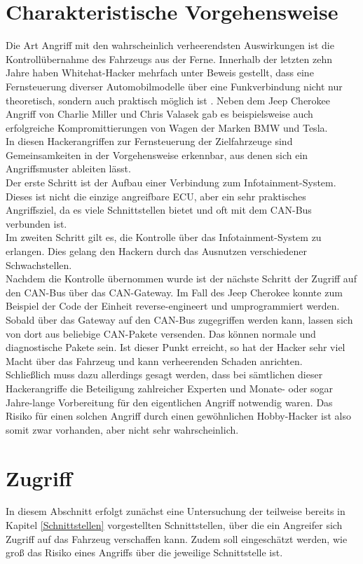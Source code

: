 \section{Charakteristische Vorgehensweise}\label{Vorgehen}
Die Art Angriff mit den wahrscheinlich verheerendsten Auswirkungen ist die Kontrollübernahme des Fahrzeugs aus der Ferne. Innerhalb der letzten zehn Jahre haben Whitehat-Hacker mehrfach unter Beweis gestellt, dass eine Fernsteuerung diverser Automobilmodelle über eine Funkverbindung nicht nur theoretisch, sondern auch praktisch möglich ist \cite[35]{Wurm.2022}. Neben dem Jeep Cherokee Angriff von Charlie Miller und Chris Valasek gab es beispielsweise auch erfolgreiche Kompromittierungen von Wagen der Marken BMW und Tesla.\\
In diesen Hackerangriffen zur Fernsteuerung der Zielfahrzeuge sind Gemeinsamkeiten in der Vorgehensweise erkennbar, aus denen sich ein Angriffsmuster ableiten lässt.\\
Der erste Schritt ist der Aufbau einer Verbindung zum Infotainment-System. Dieses ist nicht die einzige angreifbare \acs{ECU}, aber ein sehr praktisches Angriffsziel, da es viele Schnittstellen bietet und oft mit dem \acs{CAN}-Bus verbunden ist.\\
Im zweiten Schritt gilt es, die Kontrolle über das Infotainment-System zu erlangen. Dies gelang den Hackern durch das Ausnutzen verschiedener Schwachstellen.\\
Nachdem die Kontrolle übernommen wurde ist der nächste Schritt der Zugriff auf den \acs{CAN}-Bus über das \acs{CAN}-Gateway. Im Fall des Jeep Cherokee konnte zum Beispiel der Code der Einheit reverse-engineert und umprogrammiert werden.\\
Sobald über das Gateway auf den \acs{CAN}-Bus zugegriffen werden kann, lassen sich von dort aus beliebige \acs{CAN}-Pakete versenden. Das können normale und diagnostische Pakete sein. Ist dieser Punkt erreicht, so hat der Hacker sehr viel Macht über das Fahrzeug und kann verheerenden Schaden anrichten.\\
Schließlich muss dazu allerdings gesagt werden, dass bei sämtlichen dieser Hackerangriffe die Beteiligung zahlreicher Experten und Monate- oder sogar Jahre-lange Vorbereitung für den eigentlichen Angriff notwendig waren. Das Risiko für einen solchen Angriff durch einen gewöhnlichen Hobby-Hacker ist also somit zwar vorhanden, aber nicht sehr wahrscheinlich.


\section{Zugriff}
In diesem Abschnitt erfolgt zunächst eine Untersuchung der teilweise bereits in Kapitel \ref{Schnittstellen} vorgestellten Schnittstellen, über die ein Angreifer sich Zugriff auf das Fahrzeug verschaffen kann. Zudem soll eingeschätzt werden, wie groß das Risiko eines Angriffs über die jeweilige Schnittstelle ist.



